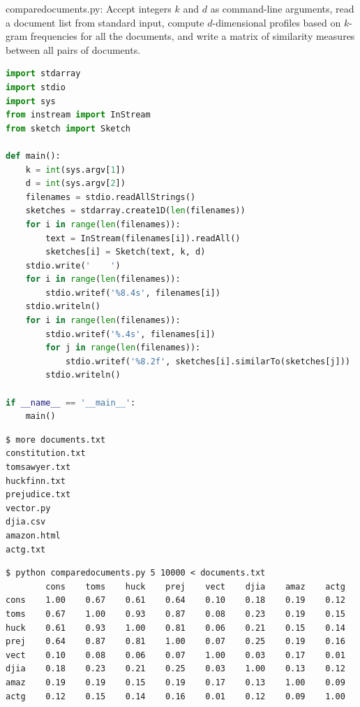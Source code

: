 \documentclass[8pt,a4paper,compress]{beamer}
\begin{document}
\begin{frame}[fragile]
\pause

\begin{framed}
\tiny comparedocuments.py: Accept integers $k$ and $d$ as command-line arguments, read a document list from standard input, compute $d$-dimensional profiles based on $k$-gram frequencies for all the documents, and write a matrix of similarity measures between all pairs of documents.
\end{framed}

\begin{lstlisting}[language=Python]
import stdarray
import stdio
import sys
from instream import InStream
from sketch import Sketch

def main():
    k = int(sys.argv[1])
    d = int(sys.argv[2])
    filenames = stdio.readAllStrings()
    sketches = stdarray.create1D(len(filenames))
    for i in range(len(filenames)):
        text = InStream(filenames[i]).readAll()
        sketches[i] = Sketch(text, k, d)
    stdio.write('    ')
    for i in range(len(filenames)):
        stdio.writef('%8.4s', filenames[i])
    stdio.writeln()
    for i in range(len(filenames)):
        stdio.writef('%.4s', filenames[i])
        for j in range(len(filenames)):
            stdio.writef('%8.2f', sketches[i].similarTo(sketches[j]))
        stdio.writeln()
    
if __name__ == '__main__':
    main()
\end{lstlisting}
\end{frame}

\begin{frame}[fragile]
\pause

\begin{lstlisting}[language={}]
$ more documents.txt
constitution.txt
tomsawyer.txt
huckfinn.txt
prejudice.txt
vector.py
djia.csv
amazon.html
actg.txt
\end{lstlisting}

\pause

\begin{lstlisting}[language={}]
$ python comparedocuments.py 5 10000 < documents.txt
        cons    toms    huck    prej    vect    djia    amaz    actg
cons    1.00    0.67    0.61    0.64    0.10    0.18    0.19    0.12
toms    0.67    1.00    0.93    0.87    0.08    0.23    0.19    0.15
huck    0.61    0.93    1.00    0.81    0.06    0.21    0.15    0.14
prej    0.64    0.87    0.81    1.00    0.07    0.25    0.19    0.16
vect    0.10    0.08    0.06    0.07    1.00    0.03    0.17    0.01
djia    0.18    0.23    0.21    0.25    0.03    1.00    0.13    0.12
amaz    0.19    0.19    0.15    0.19    0.17    0.13    1.00    0.09
actg    0.12    0.15    0.14    0.16    0.01    0.12    0.09    1.00
\end{lstlisting}
\end{frame}
\end{document}
